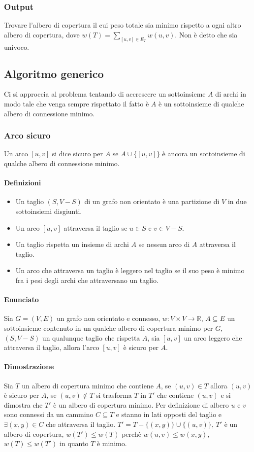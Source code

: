 	\subsubsection{Output}
	Trovare l'albero di copertura il cui peso totale sia minimo rispetto a ogni altro albero di copertura, dove $w(T)=\sum\limits_{[u, v]\in E_T} w(u, v)$. Non \`e detto che sia univoco.
	\subsection{Algoritmo generico}
	Ci si approccia al problema tentando di accrescere un sottoinsieme $A$ di archi in modo tale che venga sempre rispettato il fatto \`e $A$ \`e un sottoinsieme di qualche albero di 
	connessione minimo.
	\subsubsection{Arco sicuro}
	Un arco $[u, v]$ si dice sicuro per $A$ se $A\cup\{[u, v]\}$ \`e ancora un sottoinsieme di qualche albero di connessione minimo.\\
	
	\paragraph{Definizioni}
	\begin{itemize}
		\item Un taglio $(S, V - S)$ di un grafo non orientato \`e una partizione di $V$ in due sottoinsiemi disgiunti.
		\item Un arco $[u, v]$ attraversa il taglio se $u\in S$ e $v\in V-S$.
		\item Un taglio rispetta un insieme di archi $A$ se nessun arco di $A$ attraversa il taglio.
		\item Un arco che attraversa un taglio \`e leggero nel taglio se il suo peso \`e minimo fra i pesi degli archi che attraversano un taglio.
	\end{itemize}
	\paragraph{Enunciato}
	Sia $G=(V, E)$ un grafo non orientato e connesso, $w:V\times V\rightarrow\mathbb{R}$, $A\subseteq E$ un sottoinsieme contenuto in un qualche albero di copertura minimo per $G$, 
	$(S, V-S)$ un qualunque taglio che rispetta $A$, sia $[u, v]$ un arco leggero che attraversa il taglio, allora l'arco $[u, v]$ \`e sicuro per $A$. 
	\paragraph{Dimostrazione}
	Sia $T$ un albero di copertura minimo che contiene $A$, se $(u, v)\in T$ allora $(u, v)$ \`e sicuro per $A$, se $(u, v)\not\in T$ si trasforma $T$ in $T'$ che contiene $(u, v)$ e si 
	dimostra che $T'$ \`e un albero di copertura minimo. Per definizione di albero $u$ e $v$ sono connessi da un cammino $C\subseteq T$ e stanno in lati opposti del taglio e $\exists(x, y)
	\in C$ che attraversa il taglio. $T'=T-\{(x, y)\}\cup\{(u, v)\}$, $T'$ \`e un albero di copertura, $w(T')\le w(T)$ perch\`e $w(u, v)\le w(x, y)$, $w(T)\le w(T')$ in quanto $T$ \`e 
	minimo.
